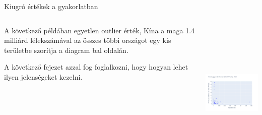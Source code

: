 \documentclass[english, aspectratio=169]{beamer}
\begin{document}
\begin{frame}{Kiugró értékek a gyakorlatban}
	\begin{columns}
		\begin{column}{.5\textwidth}
			A következő példában egyetlen outlier érték, Kína a maga 1.4 milliárd lélekszámával az összes többi országot egy kis területbe szorítja a diagram bal oldalán.\par\medskip
			A következő fejezet azzal fog foglalkozni, hogy hogyan lehet ilyen jelenségeket kezelni.
		\end{column}
		\begin{column}{.5\textwidth}
			\begin{center}
				\includegraphics[width=7cm, height=7cm, keepaspectratio]{images/scatter_13.png}
			\end{center}
		\end{column}
	\end{columns}
\end{frame}
\end{document}
